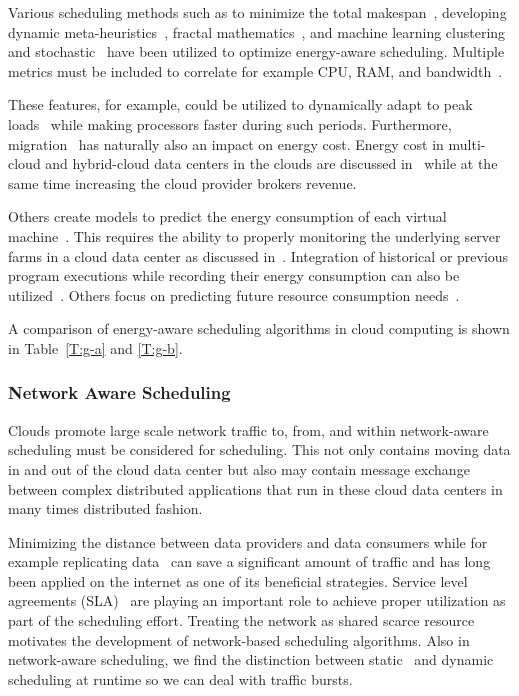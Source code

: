 \documentclass[final,5p,times,twocolumn]{elsarticle}
\begin{document}
Various scheduling methods such as to minimize the total makespan~\cite{bessis2013using}, developing dynamic meta-heuristics~\cite{bi2017application}, fractal mathematics~\cite{duan2016energy}, and machine learning clustering and stochastic~\cite{bui2017energy} have been utilized to optimize energy-aware scheduling. Multiple metrics must be included to correlate for example CPU, RAM, and bandwidth~\cite{zhu2017three}.

These features, for example, could be utilized to dynamically adapt to peak loads~\cite{duan2016energy} while making processors faster during such periods. Furthermore, migration~\cite{beloglazov2010energy} has naturally also an impact on energy cost. Energy cost in multi-cloud and hybrid-cloud data centers in the clouds are discussed in~\cite{quarati2013hybrid,garg2011environment,gai2016dynamic,dabbagh2015energy} while at the same time increasing the cloud provider brokers revenue.


Others create models to predict the energy consumption of each virtual machine~\cite{kim2014energy}. This requires the ability to properly monitoring the underlying server farms in a cloud data center as discussed in~\cite{van2012comparison}. Integration of historical or previous program executions while recording their energy consumption can also be utilized~\cite{hu2010scheduling}. Others focus on predicting future resource consumption needs~\cite{dabbagh2015energy}.

A comparison of energy-aware scheduling algorithms in cloud computing is shown in Table~\ref{T:g-a} and \ref{T:g-b}.



%

\subsubsection{Network Aware Scheduling}\label{sec:network}


Clouds promote large scale network traffic to, from, and within network-aware scheduling must be considered for scheduling. This not only contains moving data in and out of the cloud data center but also may contain message exchange between complex distributed applications that run in these cloud data centers in many times distributed fashion.

Minimizing the distance between data providers and data consumers while for example replicating data~\cite{www-akamai} can save a significant amount of traffic and has long been applied on the internet as one of its beneficial strategies. Service level agreements (SLA)~\cite{breitgand2012improving} are playing an important role to achieve proper utilization as part of the scheduling effort. Treating the network as shared scarce resource~\cite{rampersaud2016sharing} motivates the development of network-based scheduling algorithms. Also in network-aware scheduling, we find the distinction between static~\cite{biran2012stable} and dynamic scheduling at runtime so we can deal with traffic bursts.
\end{document}
